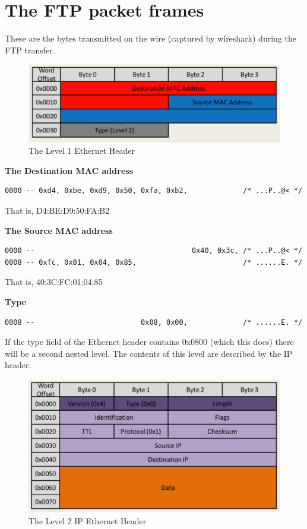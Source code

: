\newpage
\section{The FTP packet frames}
These are the bytes transmitted on the wire (captured by wireshark)
during the FTP transfer. 

\begin{figure}[ht!]
\centering
\includegraphics[scale=0.75]{eps/level1Header.eps}
\caption{The Level 1 Ethernet Header\cite{37}}
\label{level1Header}
\end{figure}
 
\vspace{1mm}
\noindent
{\bf The Destination MAC address}
\begin{verbatim}
0000 -- 0xd4, 0xbe, 0xd9, 0x50, 0xfa, 0xb2,             /* ...P..@< */
\end{verbatim}
That is, D4:BE:D9:50:FA:B2

\vspace{1mm}
\noindent
{\bf The Source MAC address}
\begin{verbatim}
0000 --                                     0x40, 0x3c, /* ...P..@< */
0008 -- 0xfc, 0x01, 0x04, 0x85,                         /* ......E. */
\end{verbatim}
That is, 40:3C:FC:01:04:85

\vspace{1mm}
\noindent
{\bf Type} 
\begin{verbatim}
0008 --                         0x08, 0x00,             /* ......E. */
\end{verbatim}
If the type field of the Ethernet header contains 0x0800 (which
this does) there will be a second nested level. The contents of
this level are described by the IP header. 

\begin{figure}[ht!]
\centering
\includegraphics[scale=0.75]{eps/level2Header.eps}
\caption{The Level 2 IP Ethernet Header\cite{37}}
\label{level2Header}
\end{figure}

